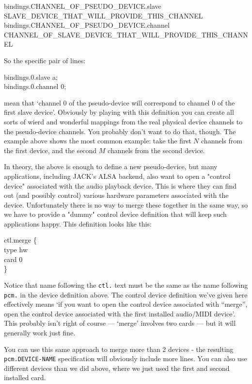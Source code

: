 \documentclass[10pt,a4paper]{book}
\begin{document}
{\begin{enumerate}
\begin{itemize}
\begin{listing}
bindings.CHANNEL\_OF\_PSEUDO\_DEVICE.slave SLAVE\_DEVICE\_THAT\_WILL\_PROVIDE\_THIS\_CHANNEL\\
bindings.CHANNEL\_OF\_PSEUDO\_DEVICE.channel CHANNEL\_OF\_SLAVE\_DEVICE\_THAT\_WILL\_PROVIDE\_THIS\_CHANNEL
\end{listing}

So the specific pair of lines:

\begin{listing}
bindings.0.slave a;\\
bindings.0.channel 0;
\end{listing}

mean that `channel 0 of the pseudo-device will correspond to channel 0
of the first slave device'. Obviously by playing with this definition
you can create all sorts of wierd and wonderful mappings from the real
physical device channels to the pseudo-device channels. You probably
don't want to do that, though. The example above shows the most common
example: take the first $N$ channels from the first device, and the
second $M$ channels from the second device.

In theory, the above is enough to define a new pseudo-device, but many
applications, including JACK's ALSA backend, also want to open a
"control device" associated with the audio playback device. This is
where they can find out (and possibly control) various hardware
parameters associated with the device. Unfortunately there is no way
to merge these together in the same way, so we have to provide a
"dummy" control device definition that will keep such applications
happy. This definition looks like this:

\begin{listing}
ctl.merge \{\\
    type hw\\
    card 0\\
\}
\end{listing}

Notice that name following the \texttt{ctl.} text must be the same as
the name following \texttt{pcm.} in the device definition above. The
control device definition we've given here effectively means `if you
want to open the control device associated with ``merge'', open the
control device associated with the first installed audio/MIDI
device'. This probably isn't right of course --- `merge' involves two
cards --- but it will generally work just fine.

You can use this same approach to merge more than 2 devices - the
resulting \texttt{pcm.DEVICE-NAME} specification will obviously
include more lines. You can also use different devices than we did
above, where we just used the first and second installed card.


\end{itemize}
\end{enumerate}}
\end{document}
